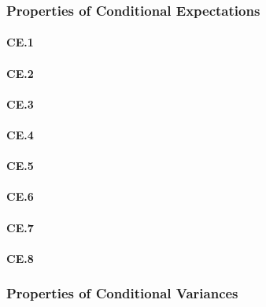 \documentclass[11pt, oneside, a4paper, article]{article}
\numberwithin{equation}{section}
\begin{document}
\subsubsection{Properties of Conditional Expectations}

\paragraph{CE.1}

\paragraph{CE.2}

\paragraph{CE.3}

\paragraph{CE.4}

\paragraph{CE.5}

\paragraph{CE.6}

\paragraph{CE.7}

\paragraph{CE.8}

\subsubsection{Properties of Conditional Variances}
\end{document}
